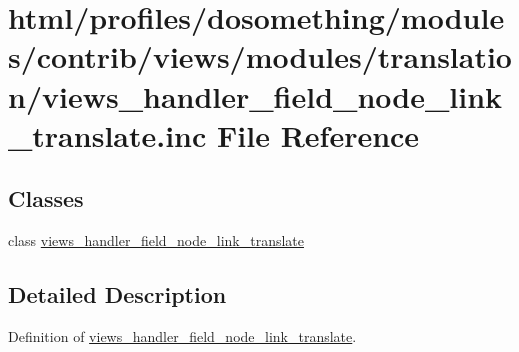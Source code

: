 \hypertarget{views__handler__field__node__link__translate_8inc}{
\section{html/profiles/dosomething/modules/contrib/views/modules/translation/views\_\-handler\_\-field\_\-node\_\-link\_\-translate.inc File Reference}
\label{views__handler__field__node__link__translate_8inc}
}
\subsection*{Classes}
\begin{DoxyCompactItemize}
\item 
class \hyperlink{classviews__handler__field__node__link__translate}{views\_\-handler\_\-field\_\-node\_\-link\_\-translate}
\end{DoxyCompactItemize}


\subsection{Detailed Description}
Definition of \hyperlink{classviews__handler__field__node__link__translate}{views\_\-handler\_\-field\_\-node\_\-link\_\-translate}. 